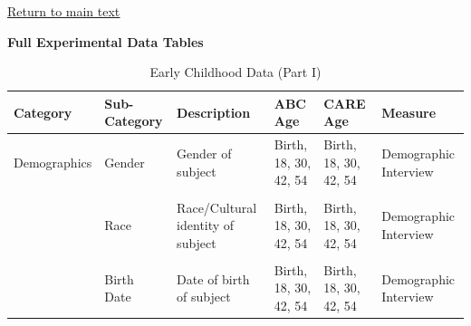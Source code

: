 \documentclass[static]{JJH-Beamer}
\begin{document}
\begin{frame}
 \addtocounter{framenumber}{-1}

\begin{center}
\hyperlink{ret:doughnut}{\underline{Return to main text}}
\end{center}

\end{frame}

\begin{frame}
 \addtocounter{framenumber}{-1}

\hypertarget{potatochips}{}
\begin{center}
\textbf{Full Experimental Data Tables}
\end{center}

\end{frame}

\begin{frame}
 \addtocounter{framenumber}{-1}

\begin{table}[H]
\caption{Early Childhood Data (Part I)}\label{tab:ecvars_1}
\begin{center}
\begin{tabular}{L{1.4cm} C{2cm} C{1.5cm} C{1.3cm} C{1.3cm}  C{2cm}}
\toprule
\textbf{Category}	&	\textbf{Sub-Category}	&	\textbf{Description}	&	\textbf{ABC Age}  	&  \textbf{CARE Age}  & 	\textbf{Measure}	\\ \midrule
Demographics	&	Gender	&	Gender of subject	&	Birth, 18, 30, 42, 54	&	 Birth, 18, 30, 42, 54	&	Demographic Interview	\\
	&	\\
	&	Race	&	Race/Cultural identity of subject	&	Birth, 18, 30, 42, 54	&	 Birth, 18, 30, 42, 54	&	 Demographic Interview\\
	&	\\
	&	Birth Date	&	Date of birth of subject	&	Birth, 18, 30, 42, 54	& 	Birth, 18, 30, 42, 54	&	 Demographic Interview	\\
\bottomrule
\end{tabular}
\end{center}
\end{table}

\end{frame}
\end{document}
